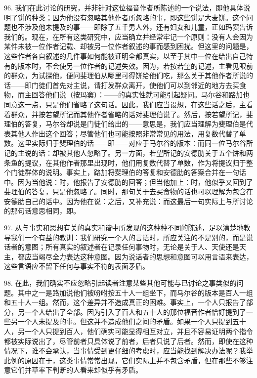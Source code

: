 96. 我们在此讨论的研究，并非针对这位福音作者所陈述的一个说法，即他具体说明了饼的种类；因为他没有忽略其他作者所忽略的事，即这些饼是大麦饼。这个问题也不涉及他未提及的事——即除了五千男人外，还有妇女和儿童，正如玛窦告诉我们的。现在，在所有这类研究中，应当确立并经常牢记一个原则：没有人会因为某件未被一位作者记载、却被另一位作者叙述的事而感到困扰。但这里的问题是，这些作者各自叙述的几件事如何能被证明全都真实，以至于其中一位在给出自己特有的版本时，不会使另一位作者的记述失效。因为，若按若望的记述，主看见眼前的群众，为试探他，便问斐理伯从哪里可得饼给他们吃，那么关于其他作者所说的话——即门徒们首先对主说，请打发群众离开，使他们可以到邻近的地方去买食物，而主回答他们说（按玛窦）：——的真实性就可能引起疑问。马尔谷和路加也同意这一点，只是他们省略了这句话。因此，我们应当设想，在这些话之后，主看着群众，并按若望所记而其他作者省略的话对斐理伯说了。然后，按若望所记，斐理伯的答复，马尔谷却说是门徒们给出的——意思是，我们应当理解为斐理伯是代表其他人作出这个回答；尽管他们也可能按照非常常见的用法，用复数代替了单数。这里实际归于斐理伯的话——即——对应于马尔谷的版本：而同一位马尔谷所记的主说的话：却被其他人忽略了。另一方面，若望所记的安德肋关于五个饼和两条鱼的提议，在其他作者那里出现时，他们用复数代替了单数，作为将提议归于整个门徒群体的说明。事实上，路加将斐理伯的答复和安德肋的答案合并在一句话中。因为当他说：时，他报告了安德肋的回答；但当他加上：时，他似乎又回到了斐理伯的答复，只是他忽略了。同时，那句关于去买食物的话也可以理解为包含在安德肋自己的话中。因为他在说：之后，又补充说：而这最后一句实际上与所讨论的那句话意思相同，即。\par

97. 从与事实和思想有关的真实和谐中所发现的这种种不同的陈述，足以清楚地教导我们一个有益的教训：我们研究一个人的言语时，所应关注的不是别的，而是说话者的意图；所有真实的叙述者在记录任何事物时，无论是关于人、天使还是天主，都应当竭尽全力表达这种意图。因为说话者的思想和意图可以用言语来表达，这些言语应不留下任何与事实不符的表面矛盾。\par

98. 在此，我们确实不应忽略引起读者注意某些其他可能与已讨论之事类似的问题。其中之一是路加说他们被吩咐按五十人一组坐下，而马尔谷的版本是百人一组和五十人一组。然而，这个差异并不造成真正的困难。事实上，一个人只报告了部分，另一个人给出了全部。因为引入了百人和五十人的那位福音作者恰好提到了一些另一个人未提及的事。但这并不造成他们之间的矛盾。如果一个人只提到五十人，另一个人只提到百人，他们确实可能显得相互对立，并且不容易证明两个指令都被实际说出了，尽管前者只具体说了前者，后者只说了后者。然而，即使在这种情况下，谁不会承认，当事情受到更仔细的考虑时，应当能找到解决办法呢？我举此例的原因在于，这类事情常常出现，它们实际上并不包含矛盾，但在那些不够注意它们并草率下判断的人看来却似乎有矛盾。\par

